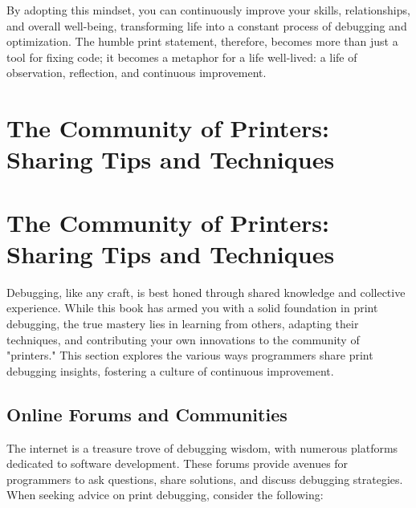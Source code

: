 \documentclass{article}
\begin{document}
{{{{By adopting this mindset, you can continuously improve your skills, relationships, and overall well-being, transforming life into a constant process of debugging and optimization. The humble print statement, therefore, becomes more than just a tool for fixing code; it becomes a metaphor for a life well-lived: a life of observation, reflection, and continuous improvement.

\newpage

\section*{The Community of Printers: Sharing Tips and Techniques} %
\label{chapter-10-5-The_Community_of_Printers__Sharing_Tips}

\section*{The Community of Printers: Sharing Tips and Techniques}

Debugging, like any craft, is best honed through shared knowledge and collective experience. While this book has armed you with a solid foundation in print debugging, the true mastery lies in learning from others, adapting their techniques, and contributing your own innovations to the community of "printers." This section explores the various ways programmers share print debugging insights, fostering a culture of continuous improvement.

\subsection*{Online Forums and Communities}

The internet is a treasure trove of debugging wisdom, with numerous platforms dedicated to software development. These forums provide avenues for programmers to ask questions, share solutions, and discuss debugging strategies. When seeking advice on print debugging, consider the following:

}}}}
\end{document}
